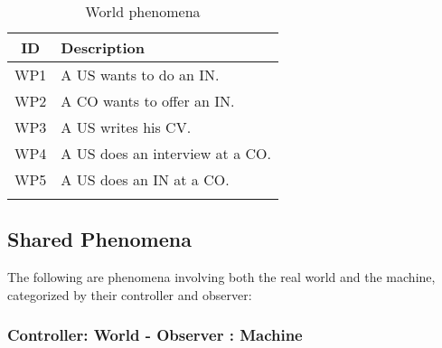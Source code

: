 \renewcommand{\arraystretch}{1.5}
\begin{longtable}{|c|p{10.5cm}|}
    \hline \rowcolor{polimiblue!40}
    \textbf{ID} & \textbf{Description} \\ \hline
    WP1 & A US wants to do an IN. \\ \hline
    WP2 & A CO wants to offer an IN. \\ \hline
    WP3 & A US writes his CV. \\ \hline
    WP4 & A US does an interview at a CO. \\ \hline
    WP5 & A US does an IN at a CO. \\ \hline
\caption{World phenomena}
\end{longtable}

\subsection{Shared Phenomena}
The following are phenomena involving both the real world and the machine, categorized by their controller and observer:

\subsubsection{Controller: World - Observer : Machine}
\renewcommand{\arraystretch}{1.5}

